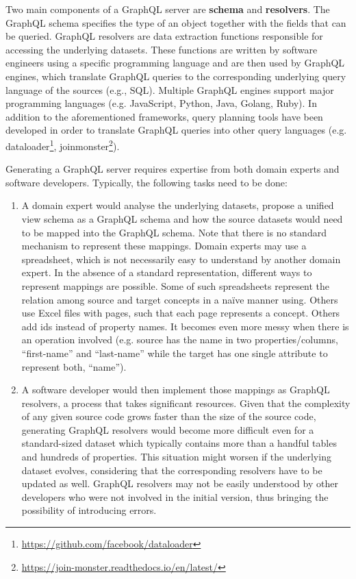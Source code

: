 Two main components of a GraphQL server are \textbf{schema} and \textbf{resolvers}. The GraphQL schema specifies the type of an object together with the fields that can be queried. GraphQL resolvers are data extraction functions responsible for accessing the underlying datasets. These functions are written by software engineers using a  specific programming language and are then used by GraphQL engines, which translate GraphQL queries to the corresponding underlying query language of the sources (e.g., SQL). Multiple GraphQL engines support major programming languages (e.g. JavaScript, Python, Java, Golang, Ruby). In addition to the aforementioned frameworks, query planning tools have been developed in order to translate GraphQL queries into other query languages (e.g. dataloader\footnote{\url{https://github.com/facebook/dataloader}}, joinmonster\footnote{\url{https://join-monster.readthedocs.io/en/latest/}}).

Generating a GraphQL server requires expertise from both domain experts and software developers. Typically, the following tasks need to be done: 
\begin{enumerate}
    \item A domain expert would analyse the underlying datasets, propose a unified view schema as a GraphQL schema and how the source datasets would need to be mapped into the GraphQL schema. Note that there is no standard mechanism to represent these mappings. Domain experts may use a spreadsheet, which is not necessarily easy to understand by another domain expert. In the absence of a standard representation, different ways to represent mappings are possible. Some of such spreadsheets represent the relation among source and target concepts in a na\"ive manner using. Others use Excel files with pages, such that each page represents a concept. Others add ids instead of property names.
    It becomes even more messy when there is an operation involved (e.g. source has the name in two properties/columns, ``first-name'' and ``last-name'' while the target has one single attribute to represent both, ``name'').
    \item A software developer would then implement those mappings as GraphQL resolvers, a process that takes significant resources. Given that the complexity of any given source code grows faster than the size of the source code, generating GraphQL resolvers would become more difficult even for a standard-sized dataset which typically contains more than a handful tables and hundreds of properties. This situation might worsen if the underlying dataset evolves, considering that the corresponding resolvers have to be updated as well. GraphQL resolvers may not be easily understood by other developers who were not involved in the initial version, thus bringing the possibility of introducing errors.
\end{enumerate}

